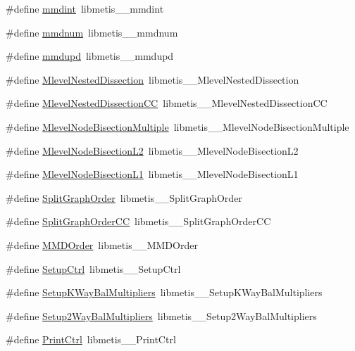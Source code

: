 \begin{DoxyCompactItemize}
\#define \hyperlink{a00957_a1e0fa8e6816e0b77f1d39bdef97eb137}{mmdint}~libmetis\+\_\+\+\_\+mmdint
\item 
\#define \hyperlink{a00957_ac9e4f0ad98f2bcfd389f9afe64fd9205}{mmdnum}~libmetis\+\_\+\+\_\+mmdnum
\item 
\#define \hyperlink{a00957_a085c0a0d0fffd2c8a912a45b06545c70}{mmdupd}~libmetis\+\_\+\+\_\+mmdupd
\item 
\#define \hyperlink{a00957_a00ef3e4317c7b5e2bfcb9bcb5f24cc2e}{Mlevel\+Nested\+Dissection}~libmetis\+\_\+\+\_\+\+Mlevel\+Nested\+Dissection
\item 
\#define \hyperlink{a00957_a1ceb5f4b0d89e296b2897c64200d0144}{Mlevel\+Nested\+Dissection\+CC}~libmetis\+\_\+\+\_\+\+Mlevel\+Nested\+Dissection\+CC
\item 
\#define \hyperlink{a00957_ab4987a76e0ed5fe632d3bf97c85f60ec}{Mlevel\+Node\+Bisection\+Multiple}~libmetis\+\_\+\+\_\+\+Mlevel\+Node\+Bisection\+Multiple
\item 
\#define \hyperlink{a00957_ac219f49d38e82940fe6ced5b83e9b512}{Mlevel\+Node\+Bisection\+L2}~libmetis\+\_\+\+\_\+\+Mlevel\+Node\+Bisection\+L2
\item 
\#define \hyperlink{a00957_a1f8a6347b46dfbd095ab0b5cc4619d9c}{Mlevel\+Node\+Bisection\+L1}~libmetis\+\_\+\+\_\+\+Mlevel\+Node\+Bisection\+L1
\item 
\#define \hyperlink{a00957_a9f4e0a558e8d0b8ef52b29b7aaceb37d}{Split\+Graph\+Order}~libmetis\+\_\+\+\_\+\+Split\+Graph\+Order
\item 
\#define \hyperlink{a00957_a08c1d3b8d04807ac05d75620aaa28f54}{Split\+Graph\+Order\+CC}~libmetis\+\_\+\+\_\+\+Split\+Graph\+Order\+CC
\item 
\#define \hyperlink{a00957_a1562123bf3bd38472d546cb6a8501682}{M\+M\+D\+Order}~libmetis\+\_\+\+\_\+\+M\+M\+D\+Order
\item 
\#define \hyperlink{a00957_a4428e858a47ed19b7e009ee5ce63bbbc}{Setup\+Ctrl}~libmetis\+\_\+\+\_\+\+Setup\+Ctrl
\item 
\#define \hyperlink{a00957_a9ae52c43a226b4756f6f2558efbcf8f0}{Setup\+K\+Way\+Bal\+Multipliers}~libmetis\+\_\+\+\_\+\+Setup\+K\+Way\+Bal\+Multipliers
\item 
\#define \hyperlink{a00957_a1fa75ba0ea674f137d5d431c9e376639}{Setup2\+Way\+Bal\+Multipliers}~libmetis\+\_\+\+\_\+\+Setup2\+Way\+Bal\+Multipliers
\item 
\#define \hyperlink{a00957_a6ae61ed6016f7bad66845f27ac88edd0}{Print\+Ctrl}~libmetis\+\_\+\+\_\+\+Print\+Ctrl
\item 

\end{DoxyCompactItemize}
